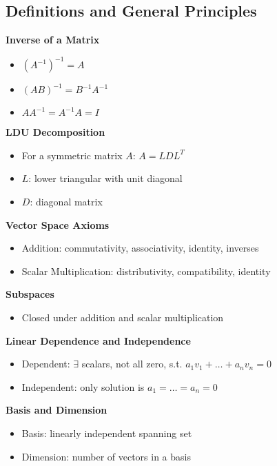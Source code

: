 \documentclass[8pt, a4paper, landscape]{extarticle}
\begin{document}
\begin{multicols*}{3}

\section*{Definitions and General Principles}

\textbf{Inverse of a Matrix}
\begin{itemize}
    \item $(A^{-1})^{-1} = A$
    \item $(AB)^{-1} = B^{-1}A^{-1}$
    \item $AA^{-1} = A^{-1}A = I$
\end{itemize}

\textbf{LDU Decomposition}
\begin{itemize}
    \item For a symmetric matrix $A$: $A = LDL^T$
    \item $L$: lower triangular with unit diagonal
    \item $D$: diagonal matrix
\end{itemize}

\textbf{Vector Space Axioms}
\begin{itemize}
    \item Addition: commutativity, associativity, identity, inverses
    \item Scalar Multiplication: distributivity, compatibility, identity
\end{itemize}

\textbf{Subspaces}
\begin{itemize}
    \item Closed under addition and scalar multiplication
\end{itemize}

\textbf{Linear Dependence and Independence}
\begin{itemize}
    \item Dependent: $\exists$ scalars, not all zero, s.t. $a_1v_1 + \ldots + a_nv_n = 0$
    \item Independent: only solution is $a_1 = \ldots = a_n = 0$
\end{itemize}

\textbf{Basis and Dimension}
\begin{itemize}
    \item Basis: linearly independent spanning set
    \item Dimension: number of vectors in a basis
\end{itemize}


\end{multicols*}
\end{document}
